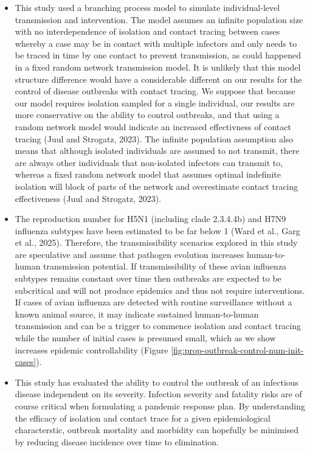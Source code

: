 \documentclass{article}
\begin{document}
\begin{itemize}
\item This study used a branching process model to simulate individual-level transmission and intervention. The model assumes an infinite population size with no interdependence of isolation and contact tracing between cases whereby a case may be in contact with multiple infectors and only needs to be traced in time by one contact to prevent transmission, as could happened in a fixed random network transmission model. It is unlikely that this model structure difference would have a considerable different on our results for the control of disease outbreaks with contact tracing. We suppose that because our model requires isolation sampled for a single individual, our results are more conservative on the ability to control outbreaks, and that using a random network model would indicate an increased effectivness of contact tracing (Juul and Strogatz, 2023). The infinite population assumption also means that although isolated individuals are assumed to not transmit, there are always other individuals that non-isolated infectors can transmit to, whereas a fixed random network model that assumes optimal indefinite isolation will block of parts of the network and overestimate contact tracing effectiveness (Juul and Strogatz, 2023).
\item The reproduction number for H5N1 (including clade 2.3.4.4b) and H7N9 influenza subtypes have been estimated to be far below 1 (Ward et al., Garg et al., 2025). Therefore, the transmissibility scenarios explored in this study are speculative and assume that pathogen evolution increases human-to-human transmission potential. If transmissibility of these avian influenza subtypes remains constant over time then outbreaks are expected to be subcritical and will not produce epidemics and thus not require interventions. If cases of avian influenza are detected with routine surveillance without a known animal source, it may indicate sustained human-to-human transmission and can be a trigger to commence isolation and contact tracing while the number of initial cases is presumed small, which as we show increases epidemic controllability (Figure \ref{fig:prop-outbreak-control-num-init-cases}).
\item This study has evaluated the ability to control the outbreak of an infectious disease independent on its severity. Infection severity and fatality risks are of course critical when formulating a pandemic response plan. By understanding the efficacy of isolation and contact trace for a given epidemiological characterstic, outbreak mortality and morbidity can hopefully be minimised by reducing disease incidence over time to elimination.

\end{itemize}
\end{document}
